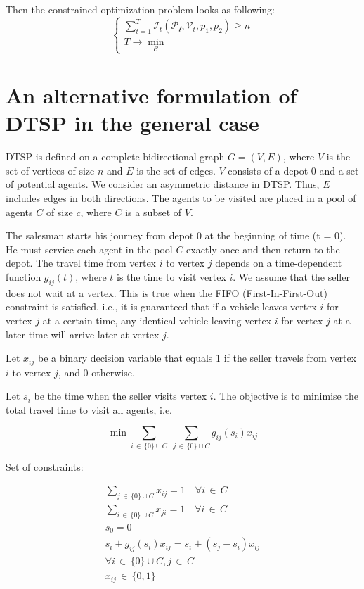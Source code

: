 Then the constrained optimization problem looks as following:
$$
\begin{cases}
\sum\limits_{t=1}^{T} \mathcal{I}_{t}(\mathcal{P_{t}}, \mathcal{V}_{t}, p_{1}, p_{2}) \geq n \\
T \to \min\limits_{\mathcal{C}}
\end{cases}
$$



\section{An alternative formulation of DTSP in the general case}
DTSP is defined on a complete bidirectional graph $ G = (V, E) $, where $ V $ is the set of vertices of size $ n $ and $ E $ is the set of edges. $ V $ consists of a depot 0 and a set of potential agents. We consider an asymmetric distance in DTSP. Thus, $ E $ includes edges in both directions. The agents to be visited are placed in a pool of agents $ C $ of size $ c $, where $ C $ is a subset of $ V $.

The salesman starts his journey from depot 0 at the beginning of time (t = 0). He must service each agent in the pool $ C $ exactly once and then return to the depot. The travel time from vertex $ i $ to vertex $ j $ depends on a time-dependent function $ g_{ij} (t) $, where $ t $ is the time to visit vertex $ i $. We assume that the seller does not wait at a vertex. This is true when the FIFO (First-In-First-Out) constraint is satisfied, i.e., it is guaranteed that if a vehicle leaves vertex $ i $ for vertex $ j $ at a certain time, any identical vehicle leaving vertex $ i $ for vertex $ j $ at a later time will arrive later at vertex $ j $.

Let $ x_{ij} $ be a binary decision variable that equals 1 if the seller travels from vertex $ i $ to vertex $ j $, and 0 otherwise.

Let $ s_i $ be the time when the seller visits vertex $ i $. The objective is to minimise the total travel time to visit all agents, i.e.

$$
\min_{}\sum_{i\, \in\, \{ 0 \}\cup C}\;\sum_{j\, \in\, \{ 0 \}\cup C} g_{ij}(s_{i})x_{ij}
$$

Set of constraints:


\begin{align}
\sum_{j \, \in \, \{ 0 \}\cup C} x_{ij} = 1 \quad  \forall i \, \in \, C \\
\sum_{i \, \in \, \{ 0 \}\cup C} x_{ji} =1 \quad  \forall i \, \in \, C \\
s_{0} = 0 \\
s_{i} + g_{ij}(s_{i})x_{ij} = s_{i} + (s_{j}-s_{i})x_{ij} \\
\forall i \, \in \, \{ 0 \} \cup C, j \, \in \, C \\
x_{ij} \, \in \, \{ 0,1 \} 
\end{align}


